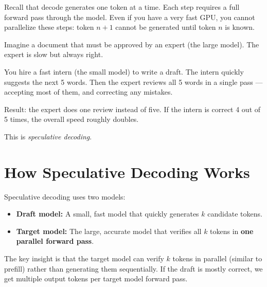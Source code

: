 \documentclass[11pt, twoside, openright]{book}
\newcommand{\analogybox}[2]{\begin{tcolorbox}[analogystyle, title={Analogy: #1}]#2\end{tcolorbox}}
\begin{document}
Recall that decode generates one token at a time.  Each step requires a full
forward pass through the model.  Even if you have a very fast GPU, you cannot
parallelize these steps: token $n+1$ cannot be generated until token $n$ is known.

\analogybox{The Draft and Reviewer}{
Imagine a document that must be approved by an expert (the large model).
The expert is slow but always right.

You hire a fast intern (the small model) to write a draft.  The intern quickly
suggests the next 5 words.  Then the expert reviews all 5 words in a single pass
--- accepting most of them, and correcting any mistakes.

Result: the expert does one review instead of five.  If the intern is correct
4 out of 5 times, the overall speed roughly doubles.

This is \textit{speculative decoding}.
}

\section{How Speculative Decoding Works}

Speculative decoding uses two models:

\begin{itemize}
  \item \textbf{Draft model:} A small, fast model that quickly generates $k$
        candidate tokens.
  \item \textbf{Target model:} The large, accurate model that verifies all $k$
        tokens in \textbf{one parallel forward pass}.
\end{itemize}

The key insight is that the target model can verify $k$ tokens in parallel
(similar to prefill) rather than generating them sequentially.  If the draft is
mostly correct, we get multiple output tokens per target model forward pass.
\end{document}
